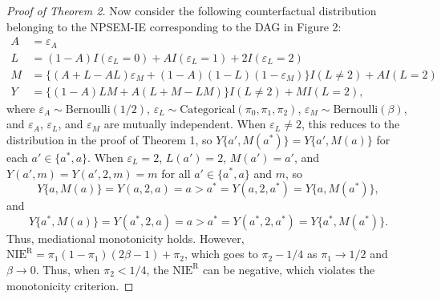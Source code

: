 \documentclass[12pt]{article}
\begin{document}
\begin{proof}[Proof of Theorem 2]
    Now consider the following counterfactual distribution belonging to the NPSEM-IE corresponding to the DAG in Figure 2:
    \begin{align*}
        A &= \varepsilon_A \\
        L &= (1-A)I(\varepsilon_L = 0) + AI(\varepsilon_L = 1) + 2I(\varepsilon_L = 2) \\
        M &= \{(A+L-AL)\varepsilon_M + (1-A)(1-L)(1-\varepsilon_M)\}I(L \neq 2) + AI(L = 2) \\
        Y &= \{(1-A)LM+A(L+M-LM)\}I(L \neq 2) + MI(L = 2),
    \end{align*}
    where $\varepsilon_A\sim \text{Bernoulli}(1/2)$, $\varepsilon_L\sim \text{Categorical}(\pi_0,\pi_1,\pi_2)$, $\varepsilon_M\sim \text{Bernoulli}(\beta)$, and $\varepsilon_A$, $\varepsilon_L$, and $\varepsilon_M$ are mutually independent. When $\varepsilon_L\neq 2$, this reduces to the distribution in the proof of Theorem 1, so $Y\{a',M(a^*)\}=Y\{a',M(a)\}$ for each $a'\in\{a^*,a\}$. When $\varepsilon_L=2$, $L(a')=2$, $M(a')=a'$, and $Y(a',m)=Y(a',2,m)=m$ for all $a'\in\{a^*,a\}$ and $m$, so 
    \[Y\{a,M(a)\}=Y(a,2,a)=a > a^* = Y(a,2,a^*) = Y\{a,M(a^*)\},\] 
    and 
    \[Y\{a^*,M(a)\} = Y(a^*,2,a) = a > a^* = Y(a^*,2,a^*) = Y\{a^*,M(a^*)\}.\]
    Thus, mediational monotonicity holds. However, $\text{NIE}^{\text{R}}=\pi_1(1-\pi_1)(2\beta-1)+\pi_2$, which goes to $\pi_2-1/4$ as $\pi_1\rightarrow 1/2$ and $\beta\rightarrow 0$. Thus, when $\pi_2<1/4$, the $\text{NIE}^{\text{R}}$ can be negative, which violates the monotonicity criterion.
\end{proof}
\end{document}
